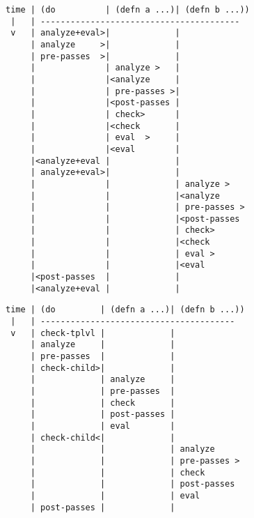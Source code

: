 \begin{figure*}
\singlespacing
\begin{verbatim}
time | (do          | (defn a ...)| (defn b ...))
 |   | ----------------------------------------
 v   | analyze+eval>|             |
     | analyze     >|             |
     | pre-passes  >|             |
     |              | analyze >   |
     |              |<analyze     |
     |              | pre-passes >|
     |              |<post-passes |
     |              | check>      |
     |              |<check       |
     |              | eval  >     |
     |              |<eval        |
     |<analyze+eval |             |
     | analyze+eval>|             |
     |              |             | analyze >   
     |              |             |<analyze     
     |              |             | pre-passes >
     |              |             |<post-passes 
     |              |             | check>      
     |              |             |<check       
     |              |             | eval >
     |              |             |<eval
     |<post-passes  |             |
     |<analyze+eval |             |
\end{verbatim}
  \caption{}
  \label{fig:analyzer:control-flow-pre-expand-side-effects}
\end{figure*}

\begin{figure*}
\singlespacing
\begin{verbatim}
time | (do         | (defn a ...)| (defn b ...))
 |   | ---------------------------------------
 v   | check-tplvl |             |
     | analyze     |             |
     | pre-passes  |             |
     | check-child>|             |
     |             | analyze     |
     |             | pre-passes  |
     |             | check       |
     |             | post-passes |
     |             | eval        |
     | check-child<|             |
     |             |             | analyze
     |             |             | pre-passes >
     |             |             | check
     |             |             | post-passes
     |             |             | eval
     | post-passes |             |
\end{verbatim}
  \caption{}
  \label{fig:analyzer:control-flow-incremental-side-effects}
\end{figure*}
